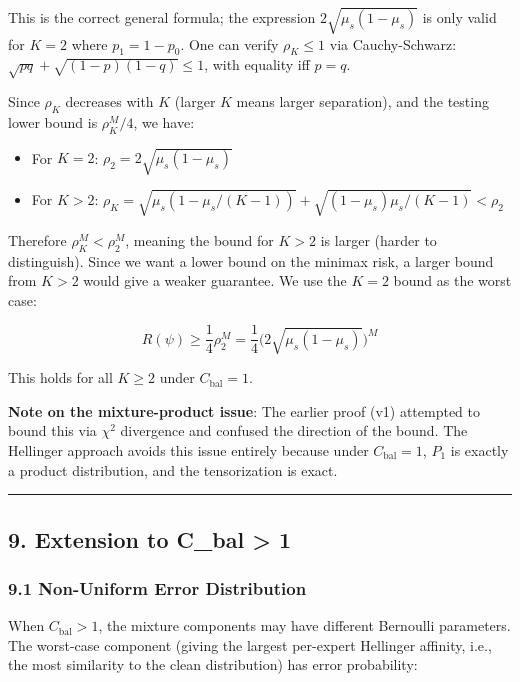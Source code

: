 \documentclass[
  12pt,
]{article}
\providecommand{\tightlist}{%
  \setlength{\itemsep}{0pt}\setlength{\parskip}{0pt}}
\begin{document}
This is the correct general formula; the expression
\(2\sqrt{\mu_s(1-\mu_s)}\) is only valid for \(K=2\) where
\(p_1 = 1-p_0\). One can verify \(\rho_K \leq 1\) via Cauchy-Schwarz:
\(\sqrt{pq} + \sqrt{(1-p)(1-q)} \leq 1\), with equality iff \(p=q\).

Since \(\rho_K\) decreases with \(K\) (larger \(K\) means larger
separation), and the testing lower bound is \(\rho_K^M/4\), we have:

\begin{itemize}
\tightlist
\item
  For \(K=2\): \(\rho_2 = 2\sqrt{\mu_s(1-\mu_s)}\)
\item
  For \(K > 2\):
  \(\rho_K = \sqrt{\mu_s(1 - \mu_s/(K-1))} + \sqrt{(1-\mu_s)\mu_s/(K-1)} < \rho_2\)
\end{itemize}

Therefore \(\rho_K^M < \rho_2^M\), meaning the bound for \(K > 2\) is
larger (harder to distinguish). Since we want a lower bound on the
minimax risk, a larger bound from \(K > 2\) would give a weaker
guarantee. We use the \(K=2\) bound as the worst case:

\[R(\psi) \geq \frac14 \rho_2^M = \frac14 \bigl(2\sqrt{\mu_s(1-\mu_s)}\bigr)^M\]

This holds for all \(K \geq 2\) under \(C_{\text{bal}} = 1\).

\textbf{Note on the mixture-product issue}: The earlier proof (v1)
attempted to bound this via \(\chi^2\) divergence and confused the
direction of the bound. The Hellinger approach avoids this issue
entirely because under \(C_{\text{bal}} = 1\), \(P_1\) is exactly a
product distribution, and the tensorization is exact.

\begin{center}\rule{0.5\linewidth}{0.5pt}\end{center}

\subsection{9. Extension to C\_bal \textgreater{}
1}\label{extension-to-c_bal-1}

\subsubsection{9.1 Non-Uniform Error
Distribution}\label{non-uniform-error-distribution}

When \(C_{\text{bal}} > 1\), the mixture components may have different
Bernoulli parameters. The worst-case component (giving the largest
per-expert Hellinger affinity, i.e., the most similarity to the clean
distribution) has error probability:
\end{document}
